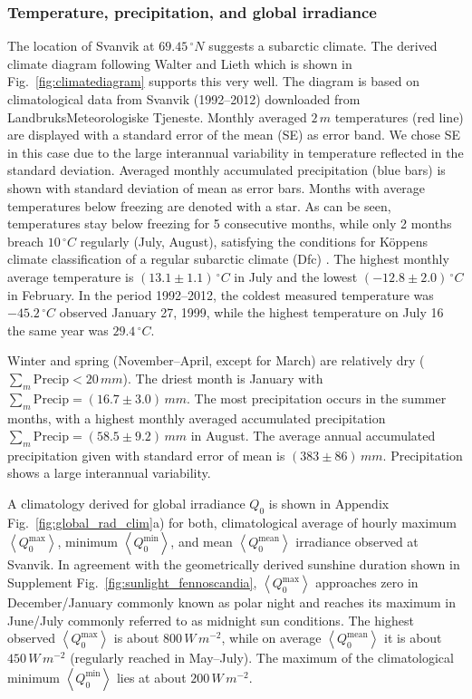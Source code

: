 \documentclass[bg, manuscript]{copernicus}
\begin{document}
\subsubsection{Temperature, precipitation, and global irradiance}
\label{subsubsec:clim_temp_prec}
The location of Svanvik at $69.45\,\unit{^\circ N}$ suggests a subarctic climate. The derived climate diagram following Walter and Lieth which is shown in Fig.~\ref{fig:climatediagram} supports this very well. The diagram is based on climatological data from Svanvik (1992--2012) downloaded from LandbruksMeteorologiske Tjeneste. Monthly averaged $2\,\unit{m}$ temperatures (red line) are displayed with a standard error of the mean (SE) as error band. We chose SE in this case due to the large interannual variability in temperature reflected in the standard deviation. Averaged monthly accumulated precipitation (blue bars) is shown with standard deviation of mean as error bars. Months with average temperatures below freezing are denoted with a star. As can be seen, temperatures stay below freezing for 5 consecutive months, while only 2 months breach $10\,\unit{^\circ C}$ regularly (July, August), satisfying the conditions for K\"{o}ppens climate classification of a regular subarctic climate (Dfc) \citep{SD:Beck2018}. The highest monthly average temperature is $(13.1\pm 1.1)\,\unit{^\circ C}$ in July and the lowest $(-12.8\pm 2.0)\,\unit{^\circ C}$ in February. In the period 1992--2012, the coldest measured temperature was $-45.2\,\unit{^\circ C}$ observed January 27, 1999, while the highest temperature on July 16 the same year was $29.4\,\unit{^\circ C}$.

Winter and spring (November--April, except for March) are relatively dry ($\sum_m \mathrm{Precip} < 20\,\unit{mm}$). The driest month is January with $\sum_m \mathrm{Precip} = (16.7\pm 3.0)\,\unit{mm}$. The most precipitation occurs in the summer months, with a highest monthly averaged accumulated precipitation $\sum_m \mathrm{Precip} = (58.5\pm 9.2)\,\unit{mm}$ in August. The average annual accumulated precipitation given with standard error of mean is $(383\pm 86)\,\unit{mm}$. Precipitation shows a large interannual variability.

A climatology derived for global irradiance $Q_0$ is shown in Appendix Fig.~\ref{fig:global_rad_clim}a) for both, climatological average of hourly maximum $\left<Q_0^\mathrm{max}\right>$, minimum $\left<Q_0^\mathrm{min}\right>$, and mean $\left<Q_0^\mathrm{mean}\right>$ irradiance observed at Svanvik. In agreement with the geometrically derived sunshine duration shown in Supplement Fig.~\ref{fig:sunlight_fennoscandia}, $\left<Q_0^\mathrm{max}\right>$ approaches zero in December/January commonly known as polar night and reaches its maximum in June/July commonly referred to as midnight sun conditions. The highest observed $\left<Q_0^\mathrm{max}\right>$ is about $800\,\unit{W\,m^{-2}}$, while on average $\left<Q_0^\mathrm{mean}\right>$ it is about $450\,\unit{W\,m^{-2}}$ (regularly reached in May--July). The maximum of the climatological minimum $\left<Q_0^\mathrm{min}\right>$ lies at about $200\,\unit{W\,m^{-2}}$.
\end{document}
